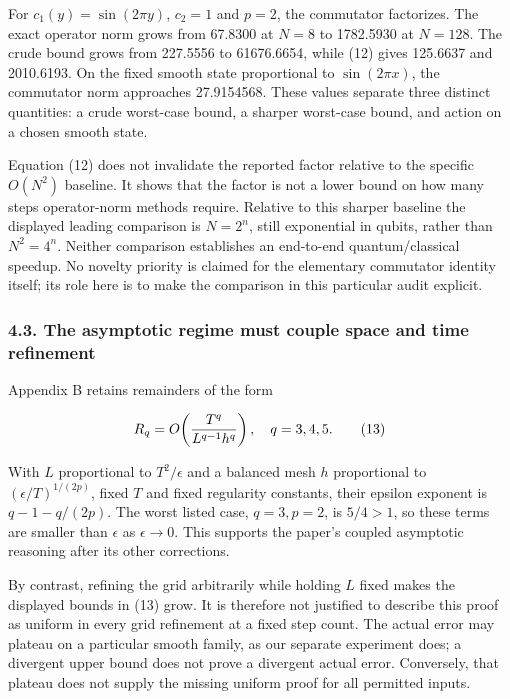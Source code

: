 For \(c_1(y)=\sin(2\pi y)\), \(c_2=1\) and \(p=2\), the commutator
factorizes. The exact operator norm grows from 67.8300 at \(N=8\) to
1782.5930 at \(N=128\). The crude bound grows from 227.5556 to
61676.6654, while (12) gives 125.6637 and 2010.6193. On the fixed smooth
state proportional to \(\sin(2\pi x)\), the commutator norm approaches
27.9154568. These values separate three distinct quantities: a crude
worst-case bound, a sharper worst-case bound, and action on a chosen
smooth state.

Equation (12) does not invalidate the reported factor relative to the
specific \(O(N^2)\) baseline. It shows that the factor is not a lower
bound on how many steps operator-norm methods require. Relative to this
sharper baseline the displayed leading comparison is \(N=2^n\), still
exponential in qubits, rather than \(N^2=4^n\). Neither comparison
establishes an end-to-end quantum/classical speedup. No novelty priority
is claimed for the elementary commutator identity itself; its role here
is to make the comparison in this particular audit explicit.

\subsubsection{4.3. The asymptotic regime must couple space and time
refinement}\label{the-asymptotic-regime-must-couple-space-and-time-refinement}

Appendix B retains remainders of the form

\[
R_q=O\!\left({T^q\over L^{q-1}h^q}\right),\quad q=3,4,5. \tag{13}
\]

With \(L\) proportional to \(T^2/\epsilon\) and a balanced mesh \(h\)
proportional to \((\epsilon/T)^{1/(2p)}\), fixed \(T\) and fixed
regularity constants, their epsilon exponent is \(q-1-q/(2p)\). The
worst listed case, \(q=3,p=2\), is \(5/4>1\), so these terms are smaller
than \(\epsilon\) as \(\epsilon\to0\). This supports the paper's coupled
asymptotic reasoning after its other corrections.

By contrast, refining the grid arbitrarily while holding \(L\) fixed
makes the displayed bounds in (13) grow. It is therefore not justified
to describe this proof as uniform in every grid refinement at a fixed
step count. The actual error may plateau on a particular smooth family,
as our separate experiment does; a divergent upper bound does not prove
a divergent actual error. Conversely, that plateau does not supply the
missing uniform proof for all permitted inputs.

